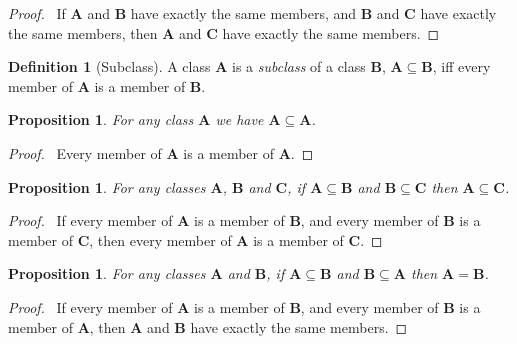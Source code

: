 \documentclass{article}
\let\qed\relax
\newtheorem{proposition}[axiom]{Proposition}
\theoremstyle{definition}
\newtheorem{definition}[axiom]{Definition}
\begin{document}
    \begin{proof}
        \pf\ If $\mathbf{A}$ and $\mathbf{B}$ have exactly the same members,
        and $\mathbf{B}$ and $\mathbf{C}$ have exactly the same members,
        then $\mathbf{A}$ and $\mathbf{C}$ have exactly the same members. \qed
    \end{proof}

    \begin{definition}[Subclass]
        A class $\mathbf{A}$ is a \emph{subclass} of a class $\mathbf{B}$,
        $\mathbf{A} \subseteq \mathbf{B}$, iff every member of $\mathbf{A}$
        is a member of $\mathbf{B}$.
    \end{definition}

    \begin{proposition}
        For any class $\mathbf{A}$ we have $\mathbf{A} \subseteq \mathbf{A}$.
    \end{proposition}

    \begin{proof}
        \pf\ Every member of $\mathbf{A}$ is a member of $\mathbf{A}$. \qed
    \end{proof}

    \begin{proposition}
        For any classes $\mathbf{A}$, $\mathbf{B}$ and $\mathbf{C}$, if $\mathbf{A} \subseteq \mathbf{B}$
        and $\mathbf{B} \subseteq \mathbf{C}$ then $\mathbf{A} \subseteq \mathbf{C}$.
    \end{proposition}

    \begin{proof}
        \pf\ If every member of $\mathbf{A}$ is a member of $\mathbf{B}$,
        and every member of $\mathbf{B}$ is a member of $\mathbf{C}$,
        then every member of $\mathbf{A}$ is a member of $\mathbf{C}$. \qed
    \end{proof}

    \begin{proposition}
        For any classes $\mathbf{A}$ and $\mathbf{B}$, if $\mathbf{A} \subseteq \mathbf{B}$
        and $\mathbf{B} \subseteq \mathbf{A}$ then $\mathbf{A} = \mathbf{B}$.
    \end{proposition}

    \begin{proof}
        \pf\ If every member of $\mathbf{A}$ is a member of $\mathbf{B}$,
        and every member of $\mathbf{B}$ is a member of $\mathbf{A}$,
        then $\mathbf{A}$ and $\mathbf{B}$ have exactly the same members. \qed
    \end{proof}
\end{document}
